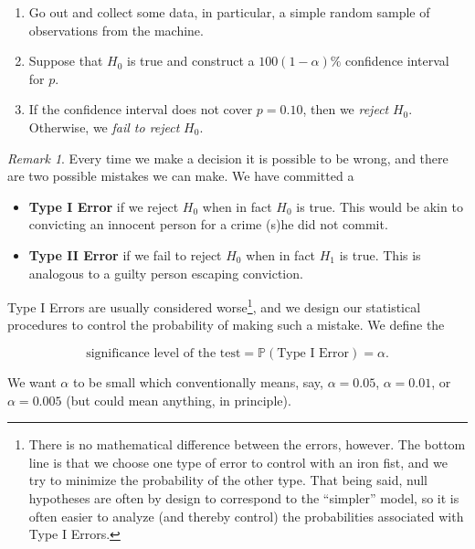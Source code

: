 \documentclass[]{book}
\providecommand{\tightlist}{%
  \setlength{\itemsep}{0pt}\setlength{\parskip}{0pt}}
\let\rmarkdownfootnote\footnote%
\def\footnote{\protect\rmarkdownfootnote}
\numberwithin{equation}{chapter}
\numberwithin{figure}{chapter}
\theoremstyle{plain}
\theoremstyle{definition}
\theoremstyle{remark}
\theoremstyle{definition}
\theoremstyle{definition}
\theoremstyle{remark}
\newtheorem*{remark}{Remark}
\begin{document}
\begin{enumerate}
\def\labelenumi{\arabic{enumi}.}
\tightlist
\item
  Go out and collect some data, in particular, a simple random sample of
  observations from the machine.
\item
  Suppose that \(H_{0}\) is true and construct a \(100(1-\alpha)\%\)
  confidence interval for \(p\).
\item
  If the confidence interval does not cover \(p = 0.10\), then we
  \emph{reject} \(H_{0}\). Otherwise, we \emph{fail to reject}
  \(H_{0}\).
\end{enumerate}

\bigskip

\begin{remark}
Every time we make a decision it is possible to be wrong, and there are
two possible mistakes we can make. We have committed a

\begin{itemize}
\tightlist
\item
  \textbf{Type I Error} if we reject \(H_{0}\) when in fact \(H_{0}\) is
  true. This would be akin to convicting an innocent person for a crime
  (s)he did not commit.
\item
  \textbf{Type II Error} if we fail to reject \(H_{0}\) when in fact
  \(H_{1}\) is true. This is analogous to a guilty person escaping
  conviction.
\end{itemize}
\end{remark}

Type I Errors are usually considered worse\footnote{There is no
  mathematical difference between the errors, however. The bottom line
  is that we choose one type of error to control with an iron fist, and
  we try to minimize the probability of the other type. That being said,
  null hypotheses are often by design to correspond to the ``simpler''
  model, so it is often easier to analyze (and thereby control) the
  probabilities associated with Type I Errors.}, and we design our
statistical procedures to control the probability of making such a
mistake. We define the

\begin{equation}
\mbox{significance level of the test} = \mathbb{P}(\mbox{Type I Error}) = \alpha.
\end{equation}

We want \(\alpha\) to be small which conventionally means, say,
\(\alpha=0.05\), \(\alpha=0.01\), or \(\alpha=0.005\) (but could mean
anything, in principle).
\end{document}
